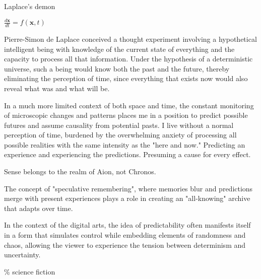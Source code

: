 \begin{center}
\Huge Laplace's demon
\vspace{2cm}
\begin{flushright}
\large
\textit{$\frac{d\mathbf{x}}{dt} = f(\mathbf{x}, t)$ }
\end{flushright}
\vspace{2cm}
\end{center}
\normalsize

Pierre-Simon de Laplace conceived a thought experiment involving a hypothetical intelligent being with knowledge of the current state of everything and the capacity to process all that information. Under the hypothesis of a deterministic universe, such a being would know both the past and the future, thereby eliminating the perception of time, since everything that exists now would also reveal what was and what will be.

In a much more limited context of both space and time, the constant monitoring of microscopic changes and patterns places me in a position to predict possible futures and assume causality from potential pasts. I live without a normal perception of time, burdened by the overwhelming anxiety of processing all possible realities with the same intensity as the "here and now." Predicting an experience and experiencing the predictions. Presuming a cause for every effect. 

Sense belongs to the realm of Aion, not Chronos. \citep{deleuze1969}

The concept of "speculative remembering", where memories blur and predictions merge with present experiences plays a role in creating an "all-knowing" archive that adapts over time. 
\citep{dutt2024}

In the context of the digital arts, the idea of predictability often manifests itself in a form that simulates control while embedding elements of randomness and chaos, allowing the viewer to experience the tension between determinism and uncertainty.

{\scriptsize \textcolor{comment}{\%  science fiction}}

